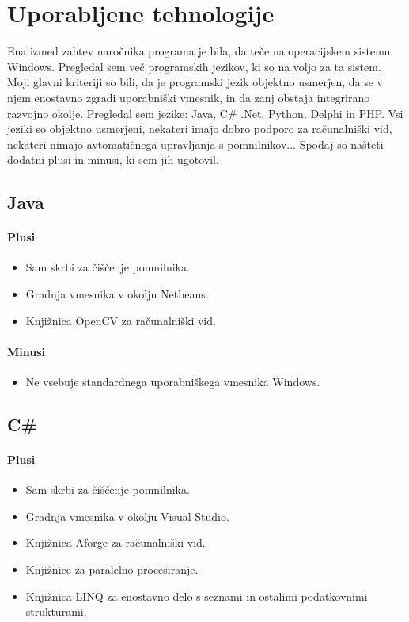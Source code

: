 \documentclass[oneside, a4paper, 12pt]{book}
\begin{document}
\section{Uporabljene tehnologije}
Ena izmed zahtev naročnika programa je bila, da teče na operacijskem sistemu Windows. Pregledal sem več programskih jezikov, ki so na voljo za ta sistem. Moji glavni kriteriji so bili, da je programski jezik objektno usmerjen, da se v njem enostavno zgradi uporabniški vmesnik, in da zanj obstaja integrirano razvojno okolje. Pregledal sem jezike: Java, C\# .Net, Python, Delphi in PHP. Vsi jeziki so objektno usmerjeni, nekateri imajo dobro podporo za računalniški vid, nekateri nimajo avtomatičnega upravljanja s pomnilnikov... Spodaj so našteti dodatni plusi in minusi, ki sem jih ugotovil.

\subsection{Java}
\paragraph{Plusi}
\begin{itemize}
\item Sam skrbi za čiščenje pomnilnika.
\item Gradnja vmesnika v okolju Netbeans.
\item Knjižnica OpenCV za računalniški vid.
\end{itemize}
\paragraph{Minusi}
\begin{itemize}
\item Ne vsebuje standardnega uporabniškega vmesnika Windows.
\end{itemize}

\subsection{C\#}
\paragraph{Plusi}
\begin{itemize}
\item Sam skrbi za čiščenje pomnilnika.
\item Gradnja vmesnika v okolju Visual Studio.
\item Knjižnica Aforge za računalniški vid.
\item Knjižnice za paralelno procesiranje.
\item Knjižnica LINQ za enostavno delo s seznami in ostalimi podatkovnimi strukturami.
\end{itemize}
\end{document}
